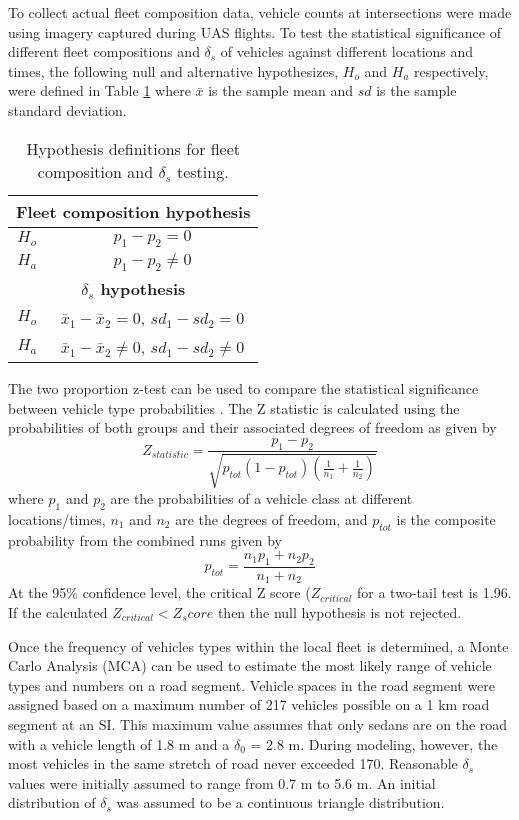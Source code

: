 \documentclass[preprint,12pt,a4paper]{elsarticle}
\begin{document}
\begin{linenumbers}
To collect actual fleet composition data, vehicle counts at intersections were made using imagery captured during UAS flights. To test the statistical significance of different fleet compositions and $\delta_{s}$ of vehicles against different locations and times, the following null and alternative hypothesizes, $H_{o}$ and $H_{a}$ respectively, were defined in Table \ref{tab:vehhyp} where $\bar{x}$ is the sample mean and $sd$ is the sample standard deviation. 
%
\begin{table}[H]
\centering
\caption{Hypothesis definitions for fleet composition and $\delta_{s}$ testing.}
\label{tab:vehhyp}
\begin{tabular}{@{}cc@{}}
\toprule
\multicolumn{2}{c}{\textbf{Fleet composition hypothesis}} \\ \midrule
$H_{o}$ & $p_{1} - p_{2} = 0$ \\
$H_{a}$ & $p_{1} - p_{2} \ne 0$\\ \midrule
\multicolumn{2}{c}{\textbf{$\delta_{s}$ hypothesis}} \\ \midrule
$H_{o}$ & $\bar{x}_{1} - \bar{x}_{2} = 0$, $sd_{1} - sd_{2} = 0$ \\
$H_{a}$ & $\bar{x}_{1} - \bar{x}_{2} \ne 0$, $sd_{1} - sd_{2} \ne 0$ \\ \bottomrule
\end{tabular}
\end{table}
%
The two proportion z-test can be used to compare the statistical significance between vehicle type probabilities \citep{Presnell2008}. The Z statistic is calculated using the probabilities of both groups and their associated degrees of freedom as given by
% 
\begin{equation}
\label{eq:2zteststat}
Z_{statistic} = \frac{p_{1}-p_{2}}{\sqrt{p_{tot}(1-p_{tot})\left ( \frac{1}{n_{1}}+\frac{1}{n_{2}} \right )}}
\end{equation}
%
\noindent
where $p_{1}$ and $p_{2}$ are the probabilities of a vehicle class at different locations/times, $n_{1}$ and $n_{2}$ are the degrees of freedom, and $p_{tot}$ is the composite probability from the combined runs given by
% 
\begin{equation}
\label{eq:2ztesttot}
p_{tot}=\frac{n_{1}p_{1} + n_{2}p_{2}}{n_{1}+n_{2}}
\end{equation}
%
At the 95\% confidence level, the critical Z score ($Z_{critical}$ for a two-tail test is 1.96. If the calculated $Z_{critical} < Z_score$ then the null hypothesis is not rejected. 

Once the frequency of vehicles types within the local fleet is determined, a Monte Carlo Analysis (MCA) can be used to estimate the most likely range of vehicle types and numbers on a road segment. Vehicle spaces in the road segment were assigned based on a maximum number of 217 vehicles possible on a 1 km road segment at an SI.  This maximum value assumes that only sedans are on the road with a vehicle length of 1.8 m and a $\delta_{0}$ = 2.8 m.  During modeling, however, the most vehicles in the same stretch of road never exceeded 170.  Reasonable $\delta_{s}$ values were initially assumed to range from 0.7 m to 5.6 m. An initial distribution of $\delta_{s}$ was assumed to be a continuous triangle distribution.
 

\end{linenumbers}
\end{document}
